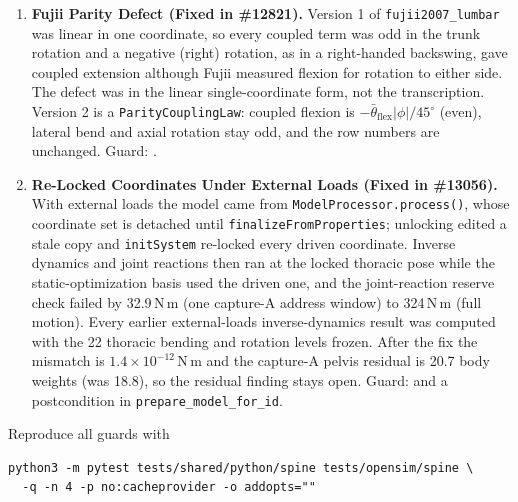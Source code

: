 \documentclass[11pt,a4paper]{article}
\begin{document}
\begin{enumerate}
  \item \textbf{Fujii Parity Defect (Fixed in \#12821).} Version 1 of \texttt{fujii2007\_lumbar} was linear in one coordinate, so every coupled term was odd in the trunk rotation and a negative (right) rotation, as in a right-handed backswing, gave coupled extension although Fujii measured flexion for rotation to either side. The defect was in the linear single-coordinate form, not the transcription. Version 2 is a \texttt{ParityCouplingLaw}: coupled flexion is $-\bar\theta_{\mathrm{flex}}|\phi|/45^\circ$ (even), lateral bend and axial rotation stay odd, and the row numbers are unchanged. Guard: .
  \item \textbf{Re-Locked Coordinates Under External Loads (Fixed in \#13056).} With external loads the model came from \texttt{ModelProcessor.process()}, whose coordinate set is detached until \texttt{finalizeFromProperties}; unlocking edited a stale copy and \texttt{initSystem} re-locked every driven coordinate. Inverse dynamics and joint reactions then ran at the locked thoracic pose while the static-optimization basis used the driven one, and the joint-reaction reserve check failed by 32.9\,N\,m (one capture-A address window) to 324\,N\,m (full motion). Every earlier external-loads inverse-dynamics result was computed with the 22 thoracic bending and rotation levels frozen. After the fix the mismatch is $1.4\times10^{-12}$\,N\,m and the capture-A pelvis residual is 20.7 body weights (was 18.8), so the residual finding stays open. Guard:  and a postcondition in \texttt{prepare\_model\_for\_id}.
\end{enumerate}
Reproduce all guards with
\begin{verbatim}
python3 -m pytest tests/shared/python/spine tests/opensim/spine \
  -q -n 4 -p no:cacheprovider -o addopts=""
\end{verbatim}
\end{document}
